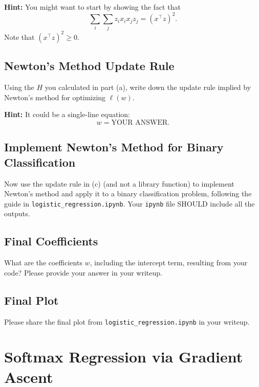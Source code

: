 \documentclass[lang=cn,11pt]{elegantbook}
\begin{document}
\textbf{Hint:} You might want to start by showing the fact that
\begin{equation}
    \sum_{i} \sum_{j} z_i x_i x_j z_j = (x^\top z)^2.
\end{equation}
Note that $(x^\top z)^2 \geq 0$.






\subsection{Newton's Method Update Rule}

Using the $H$ you calculated in part (a), write down the update rule implied by Newton’s method for optimizing $\ell(w)$. 

\textbf{Hint:} It could be a single-line equation:
\begin{equation}
    w = \text{YOUR ANSWER}.
\end{equation}

\subsection{Implement Newton’s Method for Binary Classification}

Now use the update rule in (c) (and not a library function) to implement Newton’s method and apply it to a binary classification problem, following the guide in \texttt{logistic\_regression.ipynb}. Your \texttt{ipynb} file SHOULD include all the outputs.

\subsection{Final Coefficients}

What are the coefficients $w$, including the intercept term, resulting from your code? Please provide your answer in your writeup.

\subsection{Final Plot}

Please share the final plot from \texttt{logistic\_regression.ipynb} in your writeup.



\section{Softmax Regression via Gradient Ascent}
\end{document}
